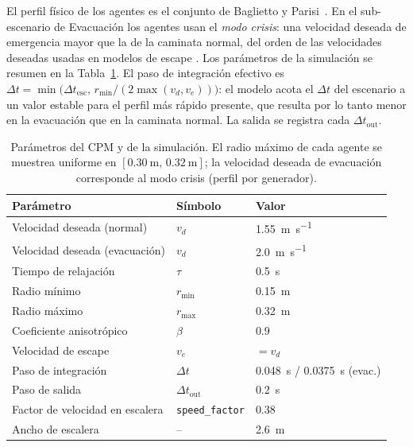 \documentclass[11pt,a4paper]{article}
\begin{document}
El perfil físico de los agentes es el conjunto de Baglietto y Parisi~\cite{baglietto2011}. En el
sub-escenario de Evacuación los agentes usan el \emph{modo crisis}: una velocidad deseada de
emergencia mayor que la de la caminata normal, del orden de las velocidades deseadas usadas en
modelos de escape \cite{helbing2000}. Los parámetros de la simulación se resumen en la
Tabla~\ref{tab:params}. El paso de integración efectivo es
$\Delta t = \min\!\bigl(\Delta t_{\text{esc}},\, r_{\min}/(2\max(v_d,v_e))\bigr)$: el modelo
acota el $\Delta t$ del escenario a un valor estable para el perfil más rápido presente, que
resulta por lo tanto menor en la evacuación que en la caminata normal. La salida se registra cada
$\Delta t_{\text{out}}$.

\begin{table}[H]
\centering
\small
\begin{tabular}{@{}lll@{}}
\toprule
\textbf{Parámetro} & \textbf{Símbolo} & \textbf{Valor} \\
\midrule
Velocidad deseada (normal)       & $v_d$   & \SI{1.55}{\metre\per\second} \\
Velocidad deseada (evacuación)   & $v_d$   & \SI{2.0}{\metre\per\second} \\
Tiempo de relajación     & $\tau$       & \SI{0.5}{\second} \\
Radio mínimo             & $r_{\min}$   & \SI{0.15}{\metre} \\
Radio máximo             & $r_{\max}$   & \SI{0.32}{\metre} \\
Coeficiente anisotrópico & $\beta$      & $0.9$ \\
Velocidad de escape      & $v_e$        & $= v_d$ \\
Paso de integración      & $\Delta t$   & \SI{0.048}{\second} / \SI{0.0375}{\second} (evac.) \\
Paso de salida           & $\Delta t_{\text{out}}$ & \SI{0.2}{\second} \\
Factor de velocidad en escalera & \texttt{speed\_factor} & $0.38$ \\
Ancho de escalera        & --           & \SI{2.6}{\metre} \\
\bottomrule
\end{tabular}
\caption{Parámetros del CPM y de la simulación. El radio máximo de cada agente se muestrea
uniforme en $[\SI{0.30}{\metre},\, \SI{0.32}{\metre}]$; la velocidad deseada de evacuación
corresponde al modo crisis (perfil por generador).}
\label{tab:params}
\end{table}
\end{document}

